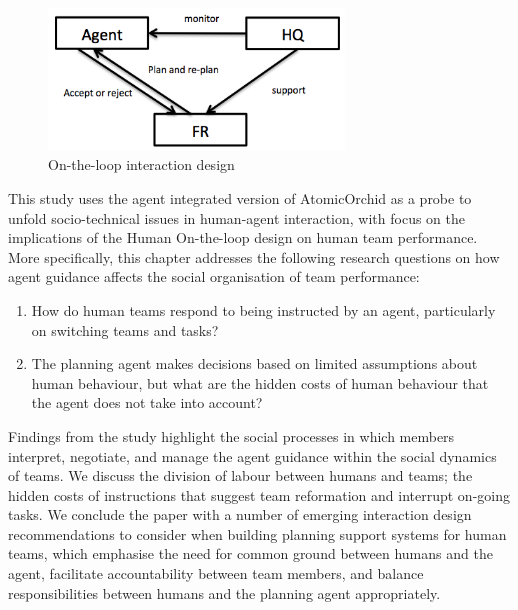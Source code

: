 \begin{figure}[h]
  \centering
  \includegraphics[width=0.7\textwidth]{img/approach/OnTheLoop}
  \caption{On-the-loop interaction design}
  \label{fig:study2OnTheLoop}
\end{figure}

This study uses the agent integrated version of AtomicOrchid as a probe to unfold socio-technical issues in human-agent interaction, with focus on the implications of the Human On-the-loop design on human team performance. More specifically, this chapter addresses the following research questions on how agent guidance affects the social organisation of team performance:\\

\begin{enumerate}
\item How do human teams respond to being instructed by an agent, particularly on switching teams and tasks?\\
\item The planning agent makes decisions based on limited assumptions about human behaviour, but what are the hidden costs of human behaviour that the agent does not take into account?\\
\end{enumerate}

Findings from the study highlight the social processes in which members interpret, negotiate, and manage the agent guidance within the social dynamics of teams. We discuss the division of labour between humans and teams; the hidden costs of instructions that suggest team reformation and interrupt on-going tasks. We conclude the paper with a number of emerging interaction design recommendations to consider when building planning support systems for human teams, which emphasise the need for common ground between humans and the agent, facilitate accountability between team members, and balance responsibilities between humans and the planning agent appropriately.\\



